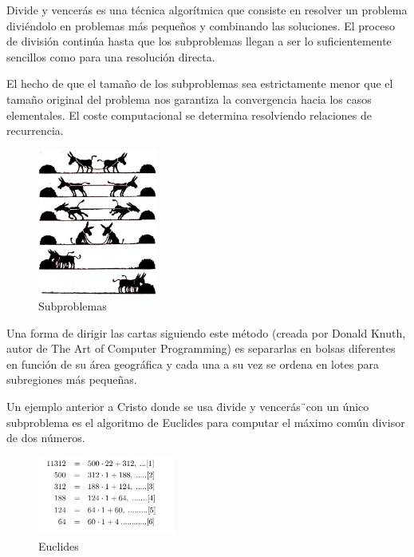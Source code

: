 
Divide y vencer\'as es una t\'ecnica algor\'itmica que consiste en resolver un problema divi\'endolo en problemas m\'as pequeños y combinando las soluciones. 
El proceso de divisi\'on contin\'ua hasta que los subproblemas llegan a ser lo suficientemente sencillos como para una resoluci\'on directa.

El hecho de que el tamaño de los subproblemas sea estrictamente menor que el tamaño original del problema nos garantiza la convergencia hacia los casos elementales.
El coste computacional se determina resolviendo relaciones de recurrencia.

\begin{figure}[htb] 
\centering
	\includegraphics[width=0.35\textwidth]{./Imagenes/perros.jpeg}
	\caption{Subproblemas} 
	\label{fig:perros} 
\end{figure}

Una forma de dirigir las cartas siguiendo este m\'etodo (creada por Donald Knuth, autor de The Art of Computer Programming) es separarlas en bolsas diferentes en funci\'on de su \'area geogr\'afica y cada una a su vez se ordena en lotes para subregiones más pequeñas.
 
Un ejemplo anterior a Cristo donde se usa \"divide y vencerás\" \ con un \'unico subproblema es el algoritmo de Euclides para computar el máximo com\'un divisor de dos n\'umeros.
 
\begin{figure}[htb] 
\centering
	\includegraphics[width=0.40\textwidth]{./Imagenes/euclides.jpg}
	\caption{Euclides} 
	\label{fig:euclides} 
\end{figure}